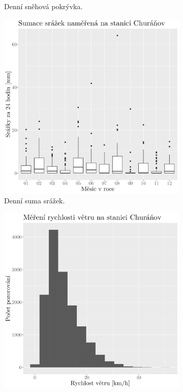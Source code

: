 \begin{figure}
\begin{subfigure}{0.45\textwidth}
		\caption{Denní sněhová pokrývka.}
		\label{fig:synop_snowcm}
	\end{subfigure}
	\hfill
	\begin{subfigure}{0.45\textwidth}
  \includegraphics[width=\textwidth]{img/synop_prec.png}
		\caption{Denní suma srážek.}
		\label{fig:synop_prec}
	\end{subfigure}
	\hfill
	\begin{subfigure}{0.45\textwidth}
  \includegraphics[width=\textwidth]{img/synop_ffkmh.png}

\end{subfigure}
\end{figure}
